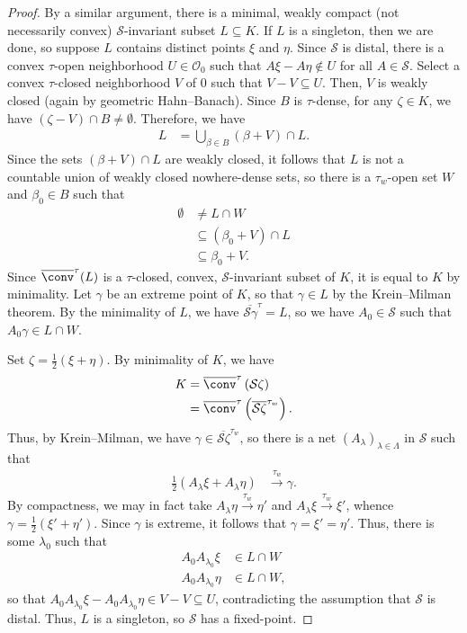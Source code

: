 \documentclass[10pt]{mypackage}
\begin{document}
\begin{proof}
  By a similar argument, there is a minimal, weakly compact (not necessarily convex) $\mathcal{S}$-invariant subset $L\subseteq K$. If $L$ is a singleton, then we are done, so suppose $L$ contains distinct points $\xi$ and $\eta$. Since $\mathcal{S}$ is distal, there is a convex $\tau$-open neighborhood $U\in \mathcal{O}_{0}$ such that $A\xi - A\eta\notin U$ for all $A\in \mathcal{S}$. Select a convex $\tau$-closed neighborhood $V$ of $0$ such that $V-V\subseteq U$. Then, $V$ is weakly closed (again by geometric Hahn--Banach). Since $B$ is $\tau$-dense, for any $\zeta\in K$, we have $\left( \zeta - V \right)\cap B \neq \emptyset$. Therefore, we have
  \begin{align*}
    L &= \bigcup_{\beta\in B} \left( \beta + V \right)\cap L.
  \end{align*}
  Since the sets $\left( \beta + V \right)\cap L$ are weakly closed, it follows that $L$ is not a countable union of weakly closed nowhere-dense sets, so there is a $\tau_{w}$-open set $W$ and $\beta_0\in B$ such that 
  \begin{align*}
    \emptyset &\neq L\cap W\\
              &\subseteq \left( \beta_0 + V \right)\cap L\\
              &\subseteq \beta_0 + V.
  \end{align*}
  Since $ \overline{\conv}^{\tau}(L) $ is a $\tau$-closed, convex, $\mathcal{S}$-invariant subset of $K$, it is equal to $K$ by minimality. Let $\gamma$ be an extreme point of $K$, so that $\gamma\in L$ by the Krein--Milman theorem. By the minimality of $L$, we have $ \overline{\mathcal{S}\gamma}^{\tau} = L $, so we have $A_0\in \mathcal{S}$ such that $A_0\gamma\in L\cap W$.

  Set $\zeta = \frac{1}{2}\left( \xi + \eta \right)$. By minimality of $K$, we have
  \begin{align*}
    K &= \overline{\conv}^{\tau} \left( \mathcal{S}\zeta \right)\\
      &= \overline{\conv}^{\tau}\left( \overline{\mathcal{S}\zeta}^{\tau_{w}} \right).
  \end{align*}
  Thus, by Krein--Milman, we have $\gamma\in \overline{\mathcal{S}\zeta}^{\tau_w}$, so there is a net $ \left( A_{\lambda} \right)_{\lambda\in\Lambda} $ in $ \mathcal{S} $ such that
  \begin{align*}
    \frac{1}{2}\left( A_{\lambda}\xi + A_{\lambda}\eta \right) &\xrightarrow{\tau_w} \gamma.
  \end{align*}
  By compactness, we may in fact take $A_{\lambda}\eta\xrightarrow{\tau_w} \eta'$ and $A_{\lambda}\xi\xrightarrow{\tau_w}\xi'$, whence $\gamma = \frac{1}{2} \left( \xi' + \eta' \right)$. Since $\gamma$ is extreme, it follows that $\gamma = \xi' = \eta'$. Thus, there is some $\lambda_0$ such that
  \begin{align*}
    A_0A_{\lambda_0}\xi &\in L\cap W\\
    A_0A_{\lambda_0}\eta &\in L\cap W,
  \end{align*}
  so that $A_0A_{\lambda_0}\xi - A_0A_{\lambda_0}\eta\in V-V\subseteq U$, contradicting the assumption that $ \mathcal{S} $ is distal. Thus, $L$ is a singleton, so $\mathcal{S}$ has a fixed-point.
\end{proof}
\end{document}
